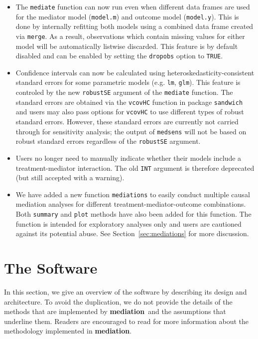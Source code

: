 \documentclass[11pt,letterpaper]{article}
\theoremstyle{plain}
\newcommand\bmediation{{\bf mediation}}
\begin{document}
\begin{itemize}
\item The {\tt mediate} function can now run even when different data frames are used
for the mediator model ({\tt model.m}) and outcome model ({\tt model.y}).  This is
done by internally refitting both models using a combined data frame created via {\tt merge}.
As a result, observations which contain missing values for either model will be
automatically listwise discarded.  This feature is by default disabled and can be
enabled by setting the {\tt dropobs} option to {\tt TRUE}.

\item Confidence intervals can now be calculated using heteroskedasticity-consistent
standard errors for some parametric models (e.g. {\tt lm}, {\tt glm}).  This
feature is controled by the new {\tt robustSE} argument of the {\tt mediate} function.
The standard errors are obtained via the {\tt vcovHC} function in package {\tt sandwich}
and users may also pass options for {\tt vcovHC} to use different types of
robust standard errors.  However, these standard errors are currently not carried 
through for sensitivity analysis; the output of {\tt medsens} will not be based
on robust standard errors regardless of the {\tt robustSE} argument.

\item Users no longer need to manually indicate whether their models include a treatment-mediator
interaction.  The old {\tt INT} argument is therefore deprecated (but still accepted
with a warning).

\item We have added a new function {\tt mediations} to easily conduct multiple
causal mediation analyses for different treatment-mediator-outcome combinations.
Both {\tt summary} and {\tt plot} methods have also been added for this function.
The function is intended for exploratory analyses only and users are cautioned against
its potential abuse.  See Section~\ref{sec:mediations} for more discussion.

\end{itemize}

\section{The Software}

In this section, we give an overview of the software by describing its
design and architecture.  To avoid the duplication, we do not provide
the details of the methods that are implemented by \bmediation\ and
the assumptions that underline them.  Readers are encouraged to read
\citet{imai:keel:yama:10,imai:keel:ting:10} for more information about
the methodology implemented in \bmediation.
\end{document}
